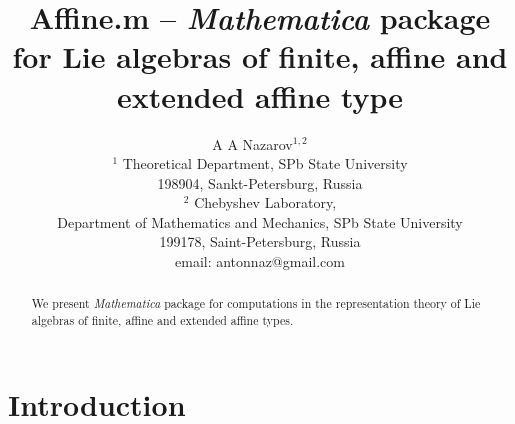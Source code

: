 \documentclass[12pt]{article}
\theoremstyle{definition}
\begin{document}
\title{{\bf Affine.m} -- {\it Mathematica} package for Lie algebras of finite, affine and extended affine type}
\author{A A Nazarov$^{1,2}$\\
{\small $^1$ Theoretical Department, SPb State University}\\
{\small 198904, Sankt-Petersburg, Russia}\\
{\small$^{2}$ Chebyshev Laboratory,}\\
{\small Department of Mathematics and Mechanics, SPb State University}\\
{\small 199178, Saint-Petersburg, Russia}\\
{\small email: antonnaz@gmail.com}}

\maketitle

\begin{abstract}
  We present {\it Mathematica} package for computations in the representation theory of Lie algebras of finite, affine and extended affine types. 
\end{abstract}


\section{Introduction}
\end{document}
